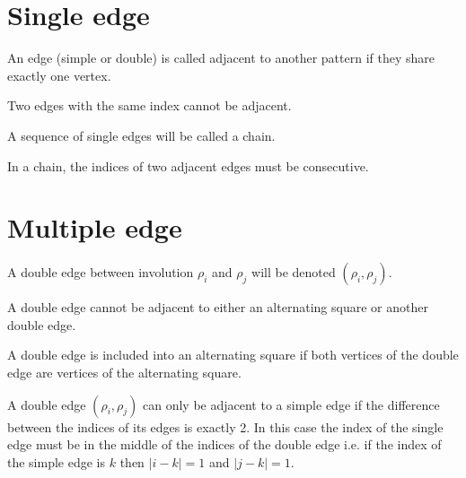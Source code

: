 \section{Single edge}

\begin{definition}
  An edge (simple or double) is called adjacent to another pattern if they share exactly one vertex.
\end{definition}

\begin{proposition}
  \label{fixed-only-1}
  Two edges with the same index cannot be adjacent.
\end{proposition}

\begin{definition}
  A sequence of single edges will be called a chain.
\end{definition}

\begin{proposition}
  \label{chain-consecutive}
  In a chain, the indices of two adjacent edges must be consecutive.
\end{proposition}

\section{Multiple edge}

\begin{notation}
  A double edge between involution $\rho_i$ and $\rho_j$ will be denoted $(\rho_i, \rho_j)$.
\end{notation}

\begin{proposition}
  A double edge cannot be adjacent to either an alternating square or another double edge.
\end{proposition}

\begin{definition}
  A double edge is included into an alternating square if both vertices of the double edge are vertices of the alternating square.
\end{definition}

\begin{proposition}
  \label{adjacent-double}
  A double edge $(\rho_i, \rho_j)$ can only be adjacent to a simple edge if the difference between the indices of its edges is exactly 2. In this case the index of the single edge must be in the middle of the indices of the double edge i.e. if the index of the simple edge is $k$ then $|i-k| = 1$ and $|j-k| = 1$.
\end{proposition}

